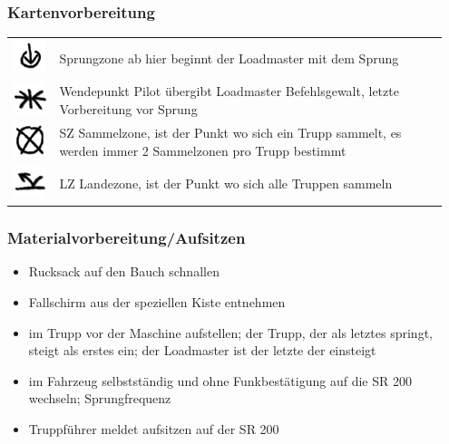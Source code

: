 \subsubsection{Kartenvorbereitung}
\begin{tabular}{C{0.1\linewidth} m{0.85\linewidth}}
	\includegraphics[scale=0.8]{./img/fortgeschrittenes/fallschirmspringen/Endpunkt.png}	&	Sprungzone ab hier beginnt der Loadmaster mit dem Sprung\\
	\includegraphics[scale=0.8]{./img/fortgeschrittenes/fallschirmspringen/Treffpunkt.png} 	&	Wendepunkt Pilot übergibt Loadmaster Befehlsgewalt, letzte Vorbereitung vor Sprung\\
	\includegraphics[scale=0.8]{./img/fortgeschrittenes/fallschirmspringen/Aufgabe.png}	&	SZ Sammelzone, ist der Punkt wo sich ein Trupp sammelt, es werden immer 2 Sammelzonen pro Trupp bestimmt \\
	\includegraphics[scale=0.8]{./img/fortgeschrittenes/fallschirmspringen/LZ.png}	&	LZ Landezone, ist der Punkt wo sich alle Truppen sammeln
\end{tabular}

\subsubsection{Materialvorbereitung/Aufsitzen}
	\begin{itemize}
		\item Rucksack auf den Bauch schnallen 
		\item  Fallschirm aus der speziellen Kiste entnehmen
		\item  im Trupp vor der Maschine aufstellen; der Trupp, der als letztes springt, steigt als erstes ein; der Loadmaster ist der letzte der einsteigt
		\item im Fahrzeug selbstständig und ohne Funkbestätigung auf die SR 200 wechseln; Sprungfrequenz
		\item  Truppführer meldet aufsitzen auf der SR 200
	\end{itemize}


